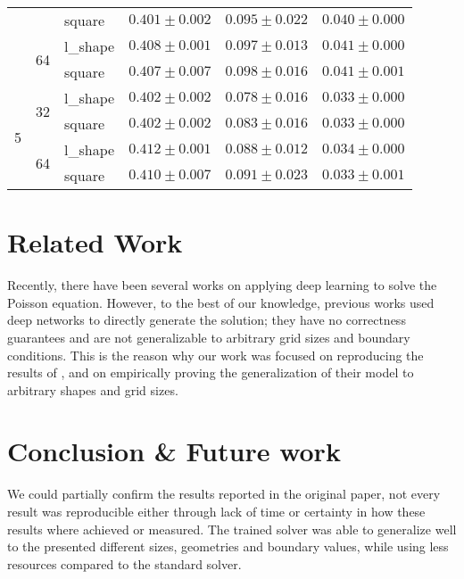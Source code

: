 \documentclass{article} %
\begin{document}
\begin{table}[h]
\begin{tabular}{lllccc}
  &    & square &  $0.401\pm0.002$ &  $0.095\pm0.022$ &  $0.040\pm0.000$ \\
\cmidrule(lr){2-6}
  & \multirow{2}{*}{64} & l\_shape &  $0.408\pm0.001$ &  $0.097\pm0.013$ &  $0.041\pm0.000$ \\
  &    & square &  $0.407\pm0.007$ &  $0.098\pm0.016$ &  $0.041\pm0.001$ \\
\cmidrule(lr){1-6}
\multirow{4}{*}{5} & \multirow{2}{*}{32} & l\_shape &  $0.402\pm0.002$ &  $0.078\pm0.016$ &  $0.033\pm0.000$ \\
  &    & square &  $0.402\pm0.002$ &  $0.083\pm0.016$ &  $0.033\pm0.000$ \\
\cmidrule(lr){2-6}
  & \multirow{2}{*}{64} & l\_shape &  $0.412\pm0.001$ &  $0.088\pm0.012$ &  $0.034\pm0.000$ \\
  &    & square &  $0.410\pm0.007$ &  $0.091\pm0.023$ &  $0.033\pm0.001$ \\
\bottomrule
\end{tabular}
    \label{tab:best_model_results}
\end{table}



    
\section{Related Work}
Recently, there have been several works on applying deep learning to solve the Poisson equation. However, to the best of our knowledge, previous works used deep networks to directly generate the solution; they have no correctness guarantees and are not generalizable to arbitrary grid sizes and
boundary conditions. This is the reason why our work was focused on reproducing the results of \cite{original_paper}, and on empirically proving the generalization of their model to arbitrary shapes and grid sizes.



\section{Conclusion \& Future work}

We could partially confirm the results reported in the original paper, not every result was reproducible either through lack of time or certainty in how these results where achieved or measured. The trained solver was able to generalize well to the presented different sizes, geometries and boundary values, while using less resources compared to the standard solver.
\end{document}
